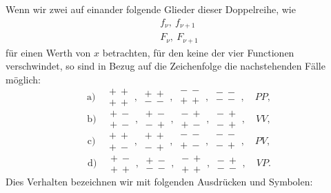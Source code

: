 
Wenn wir zwei auf einander folgende Glieder dieser Doppelreihe, wie
\[
\begin{array}{l}
f_\nu,\ f_{\nu+1} \\
F_\nu,\ F_{\nu+1}
\end{array}
\]
für einen Werth von $x$ betrachten, für den keine der vier Functionen
verschwindet, so sind in Bezug auf die Zeichenfolge die nachstehenden
Fälle möglich:
\[
\text{a)}\quad
\begin{array}{c}+\ +\\+\ +\end{array},\
\begin{array}{c}+\ +\\-\ -\end{array},\
\begin{array}{c}-\ -\\+\ +\end{array},\
\begin{array}{c}-\ -\\-\ -\end{array},\quad PP,
\]
\[
\text{b)}\quad
\begin{array}{c}+\ -\\+\ -\end{array},\
\begin{array}{c}+\ -\\-\ +\end{array},\
\begin{array}{c}-\ +\\+\ -\end{array},\
\begin{array}{c}-\ +\\-\ +\end{array},\quad VV,
\]
\[
\text{c)}\quad
\begin{array}{c}+\ +\\+\ -\end{array},\
\begin{array}{c}+\ +\\-\ +\end{array},\
\begin{array}{c}-\ -\\+\ -\end{array},\
\begin{array}{c}-\ -\\-\ +\end{array},\quad PV,
\]
\[
\text{d)}\quad
\begin{array}{c}+\ -\\+\ +\end{array},\
\begin{array}{c}+\ -\\-\ -\end{array},\
\begin{array}{c}-\ +\\+\ +\end{array},\
\begin{array}{c}-\ +\\-\ -\end{array},\quad VP.
\]
Dies Verhalten bezeichnen wir mit folgenden Ausdrücken und Symbolen:


